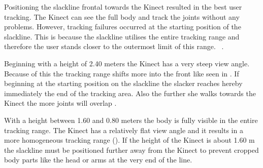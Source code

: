 Positioning the slackline frontal towards the Kinect resulted in the best user tracking.
The Kinect can see the full body and track the joints without any problems.
However, tracking failures occurred at the starting position of the slackline. This is because the slackline utilises the entire tracking range and therefore the user stands closer to the outermost limit of this range.
~\textbf{}.


Beginning with a height of 2.40 meters the Kinect has a very steep view angle.
Because of this the tracking range shifts more into the front like seen in \textbf{}. If beginning at the starting position on the slackline the slacker reaches hereby immediately the end of the tracking area. Also the further she walks towards the Kinect the more joints will overlap .

With a height between 1.60 and 0.80 meters the body is fully visible in the entire tracking range. The Kinect has a relatively flat view angle and it results in a more homogeneous tracking range (\textbf{}).
If the height of the Kinect is about 1.60 m the slackline must be positioned further away from the Kinect to prevent cropped body parts like the head or arms at the very end of the line.

